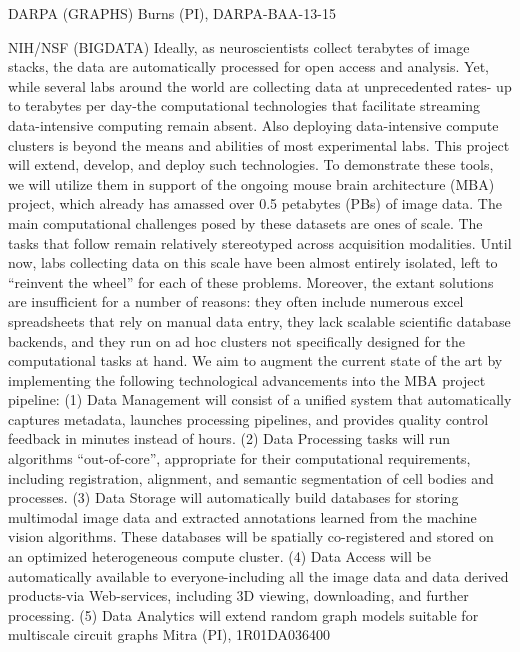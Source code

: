 \documentclass[10pt,colorlinks=true,urlcolor=blue]{moderncv}
\begin{document}
    {DARPA (GRAPHS)}
    {}
    {Burns (PI), DARPA-BAA-13-15}{}

    {NIH/NSF (BIGDATA)}
    {
        Ideally, as neuroscientists collect terabytes of image stacks, the data are automatically processed for open access and analysis. Yet, while several labs around the world are collecting data at unprecedented rates- up to terabytes per day-the computational technologies that facilitate streaming data-intensive computing remain absent. Also deploying data-intensive compute clusters is beyond the means and abilities of most experimental labs. This project will extend, develop, and deploy such technologies. To demonstrate these tools, we will utilize them in support of the ongoing mouse brain architecture (MBA) project, which already has amassed over 0.5 petabytes (PBs) of image data. The main computational challenges posed by these datasets are ones of scale. The tasks that follow remain relatively stereotyped across acquisition modalities. Until now, labs collecting data on this scale have been almost entirely isolated, left to ``reinvent the wheel'' for each of these problems. Moreover, the extant solutions are insufficient for a number of reasons: they often include numerous excel spreadsheets that rely on manual data entry, they lack scalable scientific database backends, and they run on ad hoc clusters not specifically designed for the computational tasks at hand.
We aim to augment the current state of the art by implementing the following technological advancements into the MBA project pipeline: (1) Data Management will consist of a unified system that automatically captures metadata, launches processing pipelines, and provides quality control feedback in minutes instead of hours. (2) Data Processing tasks will run algorithms ``out-of-core'', appropriate for their computational requirements, including registration, alignment, and semantic segmentation of cell bodies and processes. (3) Data Storage will automatically build databases for storing multimodal image data and extracted annotations learned from the machine vision algorithms. These databases will be spatially co-registered and stored on an optimized heterogeneous compute cluster. (4) Data Access will be automatically available to everyone-including all the image data and data derived products-via Web-services, including 3D viewing, downloading, and further processing. (5) Data Analytics will extend random graph models suitable for multiscale circuit graphs%
    }
    {Mitra (PI), 1R01DA036400}{}
\end{document}

